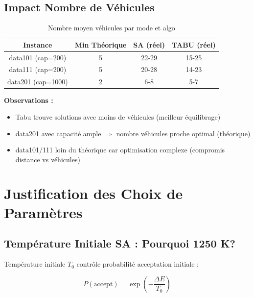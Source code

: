 \documentclass[12pt,a4paper,twoside]{report}
\begin{document}
\section{Impact Nombre de Véhicules}

\begin{table}[H]
    \centering
    \caption{Nombre moyen véhicules par mode et algo}
    \begin{tabular}{|c|c|c|c|}
        \hline
        \textbf{Instance}  & \textbf{Min Théorique} & \textbf{SA (réel)} & \textbf{TABU (réel)} \\
        \hline
        data101 (cap=200)  & 5                      & 22-29              & 15-25                \\
        data111 (cap=200)  & 5                      & 20-28              & 14-23                \\
        data201 (cap=1000) & 2                      & 6-8                & 5-7                  \\
        \hline
    \end{tabular}
\end{table}

\textbf{Observations :}

\begin{itemize}
    \item Tabu trouve solutions avec moins de véhicules (meilleur équilibrage)
    \item data201 avec capacité ample $\Rightarrow$ nombre véhicules proche optimal
          (théorique)
    \item data101/111 loin du théorique car optimisation complexe (compromis distance vs
          véhicules)
\end{itemize}

\chapter{Justification des Choix de Paramètres}

\section{Température Initiale SA : Pourquoi 1250 K?}

Température initiale $T_0$ contrôle probabilité acceptation initiale :

\begin{equation}
    P(\text{accept}) = \exp\left(-\frac{\Delta E}{T_0}\right)
\end{equation}
\end{document}
